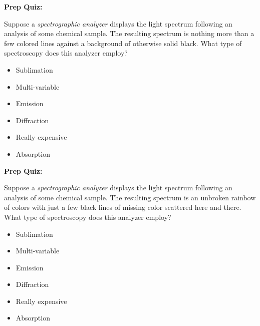 \vfil \eject

\noindent
{\bf Prep Quiz:}

Suppose a {\it spectrographic analyzer} displays the light spectrum following an analysis of some chemical sample.  The resulting spectrum is nothing more than a few colored lines against a background of otherwise solid black.  What type of spectroscopy does this analyzer employ?

\begin{itemize}
\item{} Sublimation
\vskip 5pt 
\item{} Multi-variable
\vskip 5pt 
\item{} Emission
\vskip 5pt 
\item{} Diffraction
\vskip 5pt 
\item{} Really expensive
\vskip 5pt 
\item{} Absorption
\end{itemize}

\vfil \eject

\noindent
{\bf Prep Quiz:}

Suppose a {\it spectrographic analyzer} displays the light spectrum following an analysis of some chemical sample.  The resulting spectrum is an unbroken rainbow of colors with just a few black lines of missing color scattered here and there.  What type of spectroscopy does this analyzer employ?

\begin{itemize}
\item{} Sublimation
\vskip 5pt 
\item{} Multi-variable
\vskip 5pt 
\item{} Emission
\vskip 5pt 
\item{} Diffraction
\vskip 5pt 
\item{} Really expensive
\vskip 5pt 
\item{} Absorption
\end{itemize}





